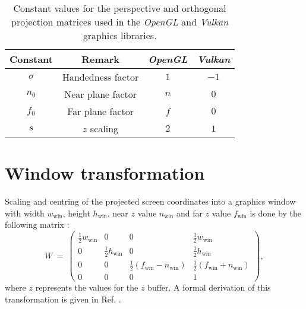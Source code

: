 \begin{table}[htb]
	\centering
	\begin{tabular}{|c|ccc|}
		\hline
		    Constant & Remark             &  \textit{OpenGL} &   \textit{Vulkan} \tabularnewline
		\hline
		    $\sigma$ & Handedness factor  &              $1$ &              $-1$ \tabularnewline
		       $n_0$ & Near plane factor  &              $n$ &               $0$ \tabularnewline
		       $f_0$ & Far plane factor   &              $f$ &               $0$ \tabularnewline
		         $s$ & $z$ scaling        &              $2$ &               $1$ \tabularnewline
		\hline
	\end{tabular}
	\caption[Projection matrix constants]{
		Constant values for the perspective and orthogonal projection matrices used in the
		\textit{OpenGL} \cite{web_OpenGL} and \textit{Vulkan} \cite{web_Vulkan} graphics libraries.}
	\label{tab:gl_constants}
\end{table}



\section{Window transformation}
\label{sec:gl_viewport}
Scaling and centring of the projected screen coordinates into a graphics window with 
width $w_{\mathrm{win}}$, height $h_{\mathrm{win}}$, 
near $z$ value $n_{\mathrm{win}}$ and far $z$ value $f_{\mathrm{win}}$ is done by the 
following matrix \cite{web_gl_viewport}:
\begin{equation}
	W \ =\ 
	\left( \begin{array}{cccc} 
		\frac{1}{2} w_{\mathrm{win}} &                              0 &                                                          0 &                              \frac{1}{2} w_{\mathrm{win}} \\
		                           0 &   \frac{1}{2} h_{\mathrm{win}} &                                                          0 &                               \frac{1}{2} h_{\mathrm{win}} \\
		                           0 &                              0 & \frac{1}{2} \left(f_{\mathrm{win}}-n_{\mathrm{win}}\right) & \frac{1}{2} \left(f_{\mathrm{win}}+n_{\mathrm{win}}\right) \\
		                           0 &                              0 &                                                          0 &                                                          1
	\end{array} \right),
\end{equation}
where $z$ represents the values for the $z$ buffer.
A formal derivation of this transformation is given in Ref. \cite{web_webgl_viewport}.



